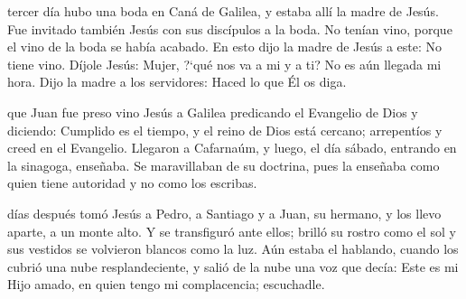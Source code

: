\documentclass[10pt,twoside]{book}
\begin{document}
\vspace{2mm}



\vspace{5mm}

\noindent{}
tercer día hubo una boda en Caná de Galilea, y estaba allí la madre de Jesús. Fue invitado también Jesús con sus discípulos a la boda.
No tenían vino, porque el vino de la boda se había acabado. En esto dijo la madre de Jesús a este: No tiene vino. Díjole Jesús: Mujer,
{?`}qué nos va a mi y a ti? No es aún llegada mi hora. Dijo la madre a los servidores: Haced lo que Él os diga.

\vspace{2mm}



\vspace{5mm}

\noindent{}
que Juan fue preso vino Jesús a Galilea predicando el Evangelio de Dios y diciendo: Cumplido es el tiempo, y el reino de Dios está cercano;
arrepentíos y creed en el Evangelio. Llegaron a Cafarnaúm, y luego, el día sábado, entrando en la sinagoga, enseñaba. Se maravillaban de su doctrina,
pues la enseñaba como quien tiene autoridad y no como los escribas.

\vspace{2mm}



\vspace{5mm}

\noindent{}
días después tomó Jesús a Pedro, a Santiago y a Juan, su hermano, y los llevo aparte, a un monte alto. Y se transfiguró ante ellos;
brilló su rostro como el sol y sus vestidos se volvieron blancos como la luz. Aún estaba el hablando, cuando los cubrió una nube resplandeciente,
y salió de la nube una voz que decía: Este es mi Hijo amado, en quien tengo mi complacencia; escuchadle.

\vspace{2mm}



\vspace{5mm}
\end{document}
